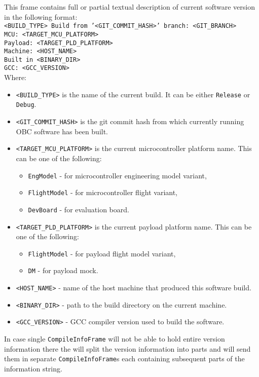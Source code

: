 
This frame contains full or partial textual description of current \pwsat software version in the following format:\bigskip\\
\texttt{<BUILD_TYPE> Build from '<GIT_COMMIT_HASH>' branch: <GIT_BRANCH>\\ MCU: <TARGET_MCU_PLATFORM>\\Payload: <TARGET_PLD_PLATFORM>\\Machine: <HOST_NAME>\\Built in <BINARY_DIR>\\GCC: <GCC_VERSION>}\bigskip\\
Where:
\begin{itemize}
    \item \texttt{<BUILD_TYPE>} is the name of the current build. It can be either \texttt{Release} or \texttt{Debug}.
    \item \texttt{<GIT_COMMIT_HASH>} is the git commit hash from which currently running OBC software has been built.
    \item \texttt{<TARGET_MCU_PLATFORM>} is the current microcontroller platform name. This can be one of the following: 
        \begin{itemize}
            \item \texttt{EngModel} - for microcontroller engineering model variant,
            \item \texttt{FlightModel} - for microcontroller flight variant,
            \item \texttt{DevBoard} - for evaluation board.
        \end{itemize}
    \item \texttt{<TARGET_PLD_PLATFORM>} is the current payload platform name. This can be one of the following: 
        \begin{itemize}
            \item \texttt{FlightModel} - for payload flight model variant,
            \item \texttt{DM} - for payload mock.
        \end{itemize}
    \item \texttt{<HOST_NAME>} - name of the host machine that produced this \OBC software build.
    \item \texttt{<BINARY_DIR>} - path to the build directory on the current machine.
    \item \texttt{<GCC_VERSION>} - GCC compiler version used to build the \OBC software.
\end{itemize}

In case single \texttt{CompileInfoFrame} will not be able to hold entire version information there the \OBC will split the version information into parts and will send them in separate \texttt{CompileInfoFrame}s each containing subsequent parts of the information string. 